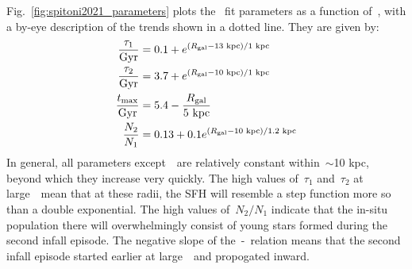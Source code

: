 \documentclass[\main/notes.tex]{subfiles}
\begin{document}
Fig.~\ref{fig:spitoni2021_parameters} plots the~\citet{Spitoni2021} fit 
parameters as a function of~\rgal, with a by-eye description of the trends 
shown in a dotted line. They are given by: 
\begin{subequations}\begin{align} 
\frac{\tau_1}{\text{Gyr}} &= 0.1 + e^{(R_\text{gal} - 13\text{ kpc}) / 1\text{ kpc}} 
\\ 
\frac{\tau_2}{\text{Gyr}} &= 3.7 + e^{(R_\text{gal} - 10\text{ kpc}) / 1\text{ kpc}} 
\\ 
\frac{t_\text{max}}{\text{Gyr}} &= 5.4 - \frac{R_\text{gal}}{5\text{ kpc}} 
\\ 
\frac{N_2}{N_1} &= 0.13 + 0.1 e^{(R_\text{gal} - 10\text{ kpc}) / 1.2\text{ kpc}}  
\end{align}\end{subequations} 
In general, all parameters except~\tmax~are relatively constant within~$\sim$10 
kpc, beyond which they increase very quickly. 
The high values of~$\tau_1$ and~$\tau_2$ at large~\rgal~mean that at these 
radii, the SFH will resemble a step function more so than a double exponential. 
The high values of~$N_2/N_1$ indicate that the in-situ population there will 
overwhelmingly consist of young stars formed during the second infall episode. 
The negative slope of the~\tmax-\rgal~relation means that the second infall 
episode started earlier at large~\rgal~and propogated inward. 

\biblio 
\end{document}
